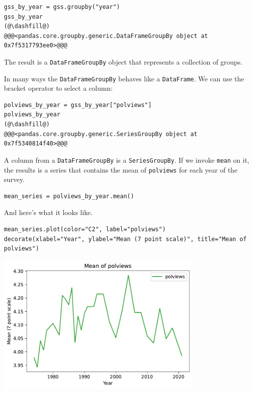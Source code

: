 \begin{lstlisting}[]
gss_by_year = gss.groupby("year")
gss_by_year
(@\dashfill@)
@@@<pandas.core.groupby.generic.DataFrameGroupBy object at 0x7f5317793ee0>@@@
\end{lstlisting}

The result is a \passthrough{\lstinline!DataFrameGroupBy!} object that
represents a collection of groups.

In many ways the \passthrough{\lstinline!DataFrameGroupBy!} behaves like
a \passthrough{\lstinline!DataFrame!}. We can use the bracket operator
to select a column:

\begin{lstlisting}[]
polviews_by_year = gss_by_year["polviews"]
polviews_by_year
(@\dashfill@)
@@@<pandas.core.groupby.generic.SeriesGroupBy object at 0x7f5340814f40>@@@
\end{lstlisting}

A column from a \passthrough{\lstinline!DataFrameGroupBy!} is a
\passthrough{\lstinline!SeriesGroupBy!}. If we invoke
\passthrough{\lstinline!mean!} on it, the results is a series that
contains the mean of \passthrough{\lstinline!polviews!} for each year of
the survey.

\begin{lstlisting}[]
mean_series = polviews_by_year.mean()
\end{lstlisting}

And here's what it looks like.

\begin{lstlisting}[]
mean_series.plot(color="C2", label="polviews")
decorate(xlabel="Year", ylabel="Mean (7 point scale)", title="Mean of polviews")
\end{lstlisting}

\begin{center}
\includegraphics[width=4in]{chapters/02_polviews_files/02_polviews_50_0.pdf}
\end{center}

